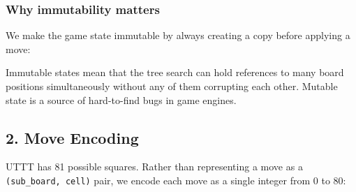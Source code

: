\hypertarget{why-immutability-matters}{%
\subsubsection{Why immutability
matters}\label{why-immutability-matters}}

We make the game state immutable by always creating a copy before
applying a move:

\begin{Shaded}
\begin{Highlighting}[]
\NormalTok{):}
\OperatorTok{=}
\OperatorTok{=}
\OperatorTok{=}
\OperatorTok{=}
\OperatorTok{=}
\OperatorTok{=}
\OperatorTok{=}
\NormalTok{    )}
\end{Highlighting}
\end{Shaded}

Immutable states mean that the tree search can hold references to many
board positions simultaneously without any of them corrupting each
other. Mutable state is a source of hard-to-find bugs in game engines.

\hypertarget{move-encoding}{%
\subsection{2. Move Encoding}\label{move-encoding}}

UTTT has 81 possible squares. Rather than representing a move as a
\texttt{(sub\_board,\ cell)} pair, we encode each move as a single
integer from 0 to 80:

\begin{Shaded}
\begin{Highlighting}[]
\NormalTok{) }\OperatorTok{{-}\textgreater{}} \NormalTok{:}
    \OperatorTok{*}  \OperatorTok{+}

\NormalTok{) }\OperatorTok{{-}\textgreater{}} \NormalTok{[}\NormalTok{, }\NormalTok{]:}
    \OperatorTok{//} \OperatorTok{\%} 
\end{Highlighting}
\end{Shaded}

